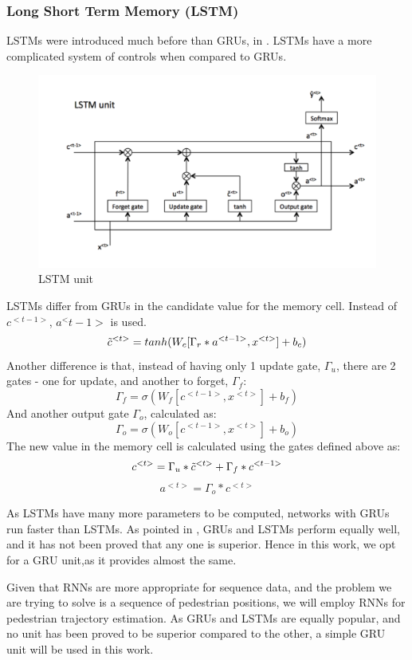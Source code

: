 \subsubsection{Long Short Term Memory (LSTM)}
LSTMs were introduced much before than GRUs, in \cite{hochreiter_long_1997}. LSTMs have a more complicated system of controls when compared to GRUs.
 \begin{figure}[h]
    \centering
    \includegraphics[height=0.25\paperheight]{Figures/LSTM_cell.png}
    \caption[LSTM Unit]{LSTM unit\cite{cavaioni_deeplearning_2018}}
    \label{fig:LSTM cell}
\end{figure}

LSTMs differ from GRUs in the candidate value for the memory cell. Instead of \(c^{<t-1>}\), \(a^<t-1>\) is used.
\[\Tilde{c}^{<t>}=tanh(W_c[\Gamma_r*a^{<t-1>},x^{<t>}]+b_c)\]
Another difference is that, instead of having only 1 update gate, \(\Gamma_u\), there are 2 gates - one for update, and another to forget, \(\Gamma_f\):
\[\Gamma_f = \sigma(W_f[c^{<t-1>},x^{<t>}]+b_f)\]
And another output gate \(\Gamma_o\), calculated as:
\[\Gamma_o = \sigma(W_o[c^{<t-1>},x^{<t>}]+b_o)\]
The new value in the memory cell is calculated using the gates defined above as:
 \[c^{<t>}=\Gamma_u*\Tilde{c}^{<t>} + \Gamma_f*{c}^{<t-1>} \]
 \[a^{<t>}=\Gamma_o*c^{<t>}\]

As LSTMs have many more parameters to be computed, networks with GRUs run faster than LSTMs. As pointed in \cite{chung_empirical_2014}, GRUs and LSTMs perform equally well, and it has not been proved that any one is superior. Hence in this work, we opt for a GRU unit,as it provides almost the same.

Given that RNNs are more appropriate for sequence data, and the problem we are trying to solve is a sequence of pedestrian positions, we will employ RNNs for pedestrian trajectory estimation. As GRUs and LSTMs are equally popular, and no unit has been proved to be superior compared to the other, a simple GRU unit will be used in this work.